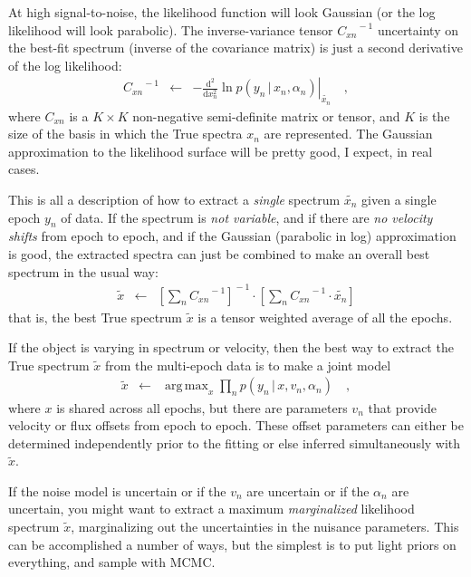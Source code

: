 \documentclass[11pt]{article}
\newcommand{\given}{\,|\,}
\newcommand{\dd}{\mathrm{d}}
\newcommand{\inverse}[1]{{#1}^{\!-1}}
\newcommand{\best}[1]{\widetilde{#1}}
\DeclareMathOperator*{\argmax}{arg\,max}
\begin{document}
At high signal-to-noise, the likelihood function will look Gaussian
(or the log likelihood will look parabolic).
The inverse-variance tensor $\inverse{C_{xn}}$ uncertainty on the
best-fit spectrum (inverse of the covariance matrix) is just a second
derivative of the log likelihood:
\begin{eqnarray}
\inverse{C_{xn}} &\leftarrow&
\left.-\frac{\dd^2}{\dd x_n^2}\ln p(y_n\given x_n, \alpha_n)\right|_{\best{x_n}}
\quad ,
\end{eqnarray}
where $C_{xn}$ is a $K\times K$ non-negative semi-definite matrix or
tensor, and $K$ is the size of the basis in which the True spectra
$x_n$ are represented.
The Gaussian approximation to the likelihood surface will be pretty
good, I expect, in real cases.

This is all a description of how to extract a \emph{single} spectrum
$\best{x_n}$ given a single epoch $y_n$ of data.
If the spectrum is \emph{not variable}, and if there are \emph{no velocity shifts}
from epoch to epoch, and if the Gaussian (parabolic in log)
approximation is good, the extracted spectra can just be combined to
make an overall best spectrum in the usual way:
\begin{eqnarray}
\best{x} &\leftarrow& 
\inverse{\left[\sum_n \inverse{C_{xn}}\right]}\cdot\left[\sum_n \inverse{C_{xn}}\cdot \best{x_n}\right]
\end{eqnarray}
that is, the best True spectrum $\best{x}$ is a tensor weighted
average of all the epochs.

If the object is varying in spectrum or velocity, then the best way to
extract the True spectrum $\best{x}$ from the multi-epoch data is to
make a joint model
\begin{eqnarray}
\best{x} &\leftarrow& \argmax_{x} \prod_n p(y_n\given x, v_n, \alpha_n)
\quad ,
\end{eqnarray}
where $x$ is shared across all epochs, but there are parameters $v_n$
that provide velocity or flux offsets from epoch to epoch.
These offset parameters can either be determined independently prior
to the fitting or else inferred simultaneously with $\best{x}$.

If the noise model is uncertain or if the $v_n$ are uncertain or if
the $\alpha_n$ are uncertain, you might want to extract a maximum
\emph{marginalized} likelihood spectrum $\best{x}$, marginalizing out
the uncertainties in the nuisance parameters.
This can be accomplished a number of ways, but the simplest is to put
light priors on everything, and sample with MCMC.
\end{document}
